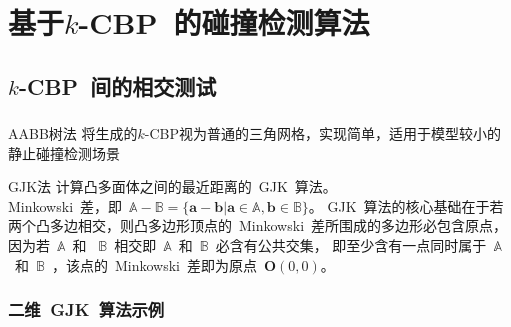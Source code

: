   \section{基于$k$-CBP~的碰撞检测算法}
    
      \subsection{$k$-CBP~间的相交测试}
      \begin{frame}
        \frametitle{}
        \begin{block}{AABB树法}
          将生成的$k$-CBP视为普通的三角网格，实现简单，适用于模型较小的静止碰撞检测场景
        \end{block}
        \begin{block}{GJK法}
          计算凸多面体之间的最近距离的~GJK~算法。\\
          Minkowski~差，即~$\mathbb{A} - \mathbb{B} = \{ \bm{a} - \bm{b} | \bm{a} \in \mathbb{A}, \bm{b} \in \mathbb{B}\} $。
GJK~算法的核心基础在于若两个凸多边相交，则凸多边形顶点的~Minkowski~差所围成的多边形必包含原点，因为若~$\mathbb{A}$~和
~$\mathbb{B}$~相交即~$\mathbb{A}$~和~$\mathbb{B}$~必含有公共交集，
即至少含有一点同时属于~$\mathbb{A}$~和~$\mathbb{B}$~，该点的~Minkowski~差即为原点~$\bm{O}(0, 0)$。
        \end{block}
      \end{frame}

      \begin{frame}
        \frametitle{二维~GJK~算法示例}
        \begin{figure}[htbp]
        \end{figure}
      \end{frame}


